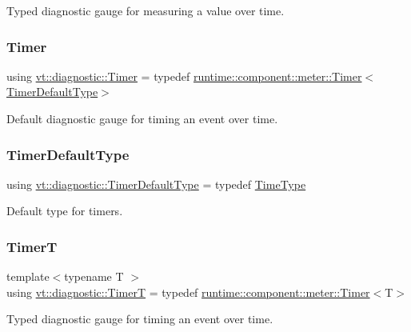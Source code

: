 Typed diagnostic gauge for measuring a value over time. 

\mbox{\label{namespacevt_1_1diagnostic_a84795feb3d3500ee2d7d59248499efb8}} 
\subsubsection{\texorpdfstring{Timer}{Timer}}
{\footnotesize\ttfamily using \hyperlink{namespacevt_1_1diagnostic_a84795feb3d3500ee2d7d59248499efb8}{vt\+::diagnostic\+::\+Timer} = typedef \hyperlink{structvt_1_1runtime_1_1component_1_1meter_1_1_timer}{runtime\+::component\+::meter\+::\+Timer}$<$\hyperlink{namespacevt_1_1diagnostic_a068855648cf3673d78a9c45a8a95f567}{Timer\+Default\+Type}$>$}



Default diagnostic gauge for timing an event over time. 

\mbox{\label{namespacevt_1_1diagnostic_a068855648cf3673d78a9c45a8a95f567}} 
\subsubsection{\texorpdfstring{Timer\+Default\+Type}{TimerDefaultType}}
{\footnotesize\ttfamily using \hyperlink{namespacevt_1_1diagnostic_a068855648cf3673d78a9c45a8a95f567}{vt\+::diagnostic\+::\+Timer\+Default\+Type} = typedef \hyperlink{namespacevt_a2b9f28078dc309ad0706b69ded743e69}{Time\+Type}}



Default type for timers. 

\mbox{\label{namespacevt_1_1diagnostic_a02535ac129513fc0ee0f68f85130b9aa}} 
\subsubsection{\texorpdfstring{TimerT}{TimerT}}
{\footnotesize\ttfamily template$<$typename T $>$ \\
using \hyperlink{namespacevt_1_1diagnostic_a02535ac129513fc0ee0f68f85130b9aa}{vt\+::diagnostic\+::\+TimerT} = typedef \hyperlink{structvt_1_1runtime_1_1component_1_1meter_1_1_timer}{runtime\+::component\+::meter\+::\+Timer}$<$T$>$}



Typed diagnostic gauge for timing an event over time. 

